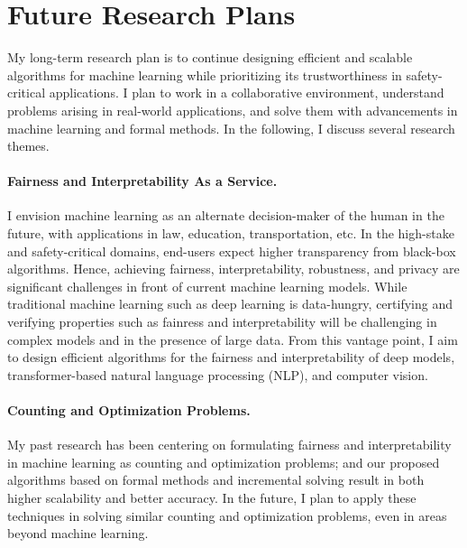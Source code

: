 \documentclass[11pt]{article}
\begin{document}
	

	
	\section*{Future Research Plans}
	 My long-term research plan is to continue designing efficient and scalable algorithms for machine learning while prioritizing its trustworthiness in safety-critical applications. I plan to work in a collaborative environment, understand problems arising in real-world applications, and solve them with advancements in machine learning and formal methods. In the following, I discuss several research themes.
	 
	 
	 \paragraph{Fairness and Interpretability As a Service.} I envision machine learning as an alternate decision-maker of the human in the future, with applications in law, education, transportation, etc. In the high-stake and safety-critical domains, end-users expect higher transparency from black-box algorithms. Hence, achieving fairness, interpretability, robustness, and privacy are significant challenges in front of current machine learning models. While traditional machine learning such as deep learning is data-hungry, certifying and verifying properties such as fainress and interpretability will be challenging in complex models and in the presence of large data. From this vantage point, I aim to design efficient algorithms for the fairness and interpretability of deep models, transformer-based natural language processing (NLP), and computer vision. 
	 
	 
	 \paragraph{Counting and Optimization Problems.} My past research has been centering on formulating fairness and interpretability in machine learning as counting and optimization problems; and our proposed algorithms based on formal methods and incremental solving result in both higher scalability and better accuracy. In the future, I plan to apply these techniques in solving similar counting and optimization problems, even in areas beyond machine learning. 
	
	
			
\end{document}
